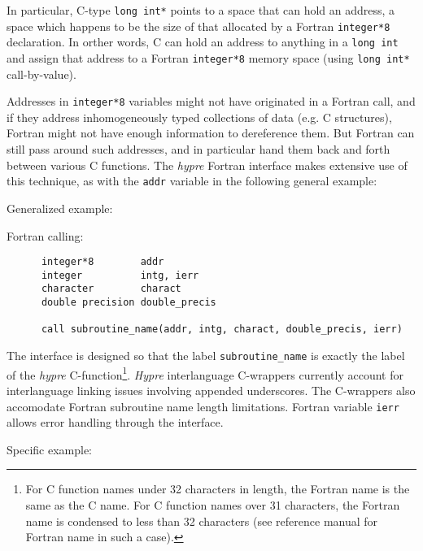 \vspace{0.2in}

In particular, C-type
\verb+long int*+ points to a space that can hold an address, a space
which happens to be the size of that allocated by a Fortran
\verb+integer*8+ declaration.
In orther words, C can hold an address to anything in a \verb+long int+ and
assign that address to a Fortran \verb+integer*8+ memory space
(using \verb+long int*+ call-by-value).

Addresses in \verb+integer*8+ variables might not have originated
in a Fortran call, and if they address inhomogeneously typed collections
of data (e.g. C structures), Fortran might not have enough information to
dereference them.  But Fortran can still pass around such addresses, and in
particular hand them back and forth between various C functions.  The
{\slshape hypre} Fortran interface makes extensive use of this technique,
as with the \verb+addr+ variable in the following general example:

\vspace{0.1in}

\noindent Generalized example:

\vspace{0.1in}

  Fortran calling:
\begin{verbatim}
      integer*8        addr
      integer          intg, ierr
      character        charact
      double precision double_precis

      call subroutine_name(addr, intg, charact, double_precis, ierr)
\end{verbatim}

The interface is designed so that the label \verb+subroutine_name+ is exactly
the label of the {\slshape hypre} C-function\footnote{For C
function names under 32 characters in length, the Fortran name is the same
as the C name.  For C function names over 31 characters, the Fortran
name is condensed to less than 32 characters (see reference manual for
Fortran name in such a case).}.
{\slshape Hypre} interlanguage C-wrappers currently
account for interlanguage linking issues involving appended
underscores.  The C-wrappers also accomodate Fortran subroutine name length
limitations.  Fortran variable \verb+ierr+ allows error handling through
the interface.

\vspace{0.1in}

\noindent Specific example:

\vspace{0.1in}

